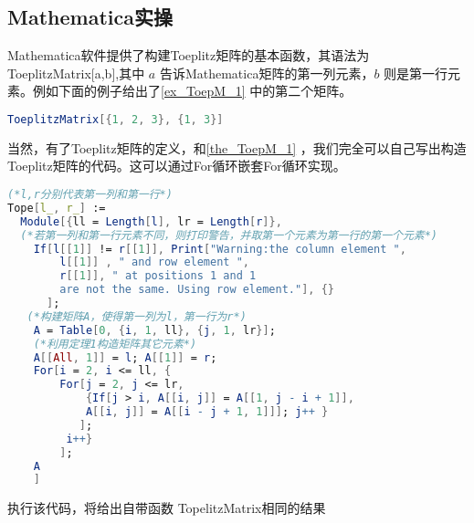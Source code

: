 \subsection{Mathematica实操}
Mathematica软件提供了构建Toeplitz矩阵的基本函数，其语法为 ToeplitzMatrix[a,b],其中 $a$ 告诉Mathematica矩阵的第一列元素，$b$ 则是第一行元素。例如下面的例子给出了\autoref{ex_ToepM_1} 中的第二个矩阵。
\begin{lstlisting}[language=mathematica, caption=Mathematica构造Toeplitz矩阵]
ToeplitzMatrix[{1, 2, 3}, {1, 3}]
\end{lstlisting}
当然，有了Toeplitz矩阵的定义，和\autoref{the_ToepM_1} ，我们完全可以自己写出构造Toeplitz矩阵的代码。这可以通过For循环嵌套For循环实现。
\begin{lstlisting}[language=mathematica, caption=Mathematica自写Toeplitz矩阵代码]
(*l,r分别代表第一列和第一行*)
Tope[l_, r_] := 
  Module[{ll = Length[l], lr = Length[r]},
  (*若第一列和第一行元素不同，则打印警告，并取第一个元素为第一行的第一个元素*)
    If[l[[1]] != r[[1]], Print["Warning:the column element ",
        l[[1]] , " and row element ", 
        r[[1]], " at positions 1 and 1
        are not the same. Using row element."], {}
      ];
   (*构建矩阵A，使得第一列为l，第一行为r*)
    A = Table[0, {i, 1, ll}, {j, 1, lr}];
    (*利用定理1构造矩阵其它元素*)
    A[[All, 1]] = l; A[[1]] = r;
    For[i = 2, i <= ll, {
        For[j = 2, j <= lr,
            {If[j > i, A[[i, j]] = A[[1, j - i + 1]], 
            A[[i, j]] = A[[i - j + 1, 1]]]; j++ } 
           ];
         i++}
        ];
    A
    ]
\end{lstlisting}
执行该代码，将给出自带函数 TopelitzMatrix相同的结果


